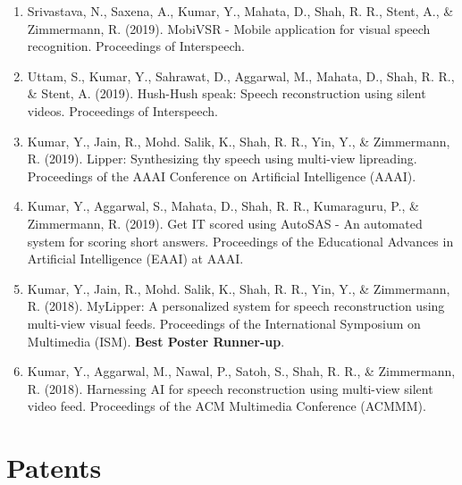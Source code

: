 \begin{enumerate}
    \item Srivastava, N., Saxena, A., Kumar, Y., Mahata, D., Shah, R. R., Stent, A., \& Zimmermann, R. (2019). MobiVSR - Mobile application for visual speech recognition. Proceedings of Interspeech.

    \item Uttam, S., Kumar, Y., Sahrawat, D., Aggarwal, M., Mahata, D., Shah, R. R., \& Stent, A. (2019). Hush-Hush speak: Speech reconstruction using silent videos. Proceedings of Interspeech.

    \item Kumar, Y., Jain, R., Mohd. Salik, K., Shah, R. R., Yin, Y., \& Zimmermann, R. (2019). Lipper: Synthesizing thy speech using multi-view lipreading. Proceedings of the AAAI Conference on Artificial Intelligence (AAAI).

    \item Kumar, Y., Aggarwal, S., Mahata, D., Shah, R. R., Kumaraguru, P., \& Zimmermann, R. (2019). Get IT scored using AutoSAS - An automated system for scoring short answers. Proceedings of the Educational Advances in Artificial Intelligence (EAAI) at AAAI.

    \item Kumar, Y., Jain, R., Mohd. Salik, K., Shah, R. R., Yin, Y., \& Zimmermann, R. (2018). MyLipper: A personalized system for speech reconstruction using multi-view visual feeds. Proceedings of the International Symposium on Multimedia (ISM). \textbf{Best Poster Runner-up}.

    \item Kumar, Y., Aggarwal, M., Nawal, P., Satoh, S., Shah, R. R., \& Zimmermann, R. (2018). Harnessing AI for speech reconstruction using multi-view silent video feed. Proceedings of the ACM Multimedia Conference (ACMMM).
\end{enumerate}



\chapter*{Patents}

